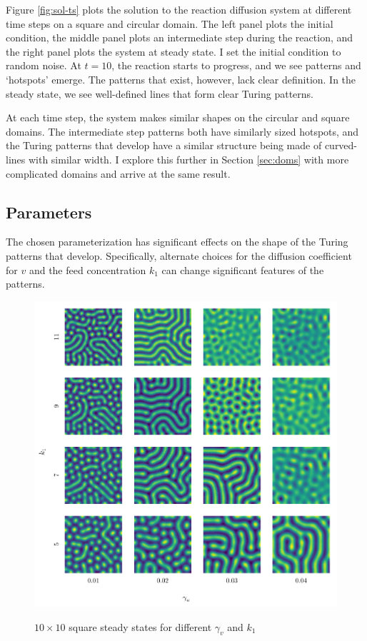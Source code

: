 Figure \ref{fig:sol-ts} plots the solution to the reaction diffusion system at different time steps on a square and circular domain. The left panel plots the initial condition, the middle panel plots an intermediate step during the reaction, and the right panel plots the system at steady state. I set the initial condition to random noise. At $t = 10$, the reaction starts to progress, and we see patterns and `hotspots' emerge. The patterns that exist, however, lack clear definition. In the steady state, we see well-defined lines that form clear Turing patterns.

At each time step, the system makes similar shapes on the circular and square domains. The intermediate step patterns both have similarly sized hotspots, and the Turing patterns that develop have a similar structure being made of curved-lines with similar width. I explore this further in Section \ref{sec:doms} with more complicated domains and arrive at the same result.


\subsection{Parameters}

The chosen parameterization has significant effects on the shape of the Turing patterns that develop. Specifically, alternate choices for the diffusion coefficient for $v$ and the feed concentration $k_1$ can change significant features of the patterns.

\begin{figure}[t!]
    \centering
    \caption{$10 \times 10$ square steady states for different $\gamma_v$ and $k_1$}
    \includegraphics{figures/square_params.pdf}
    \label{fig:sq-pars}
\end{figure}

